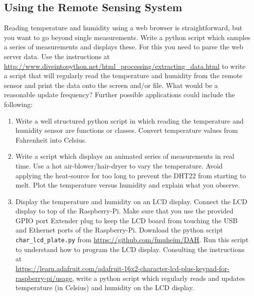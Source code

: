 \subsection{Using the  Remote Sensing System}

Reading temperature and humidity using a web browser is 
straightforward, but you want to go beyond single measurements.
Write a python script which samples a series of measurements
and displays these. For this you need to parse the web server data.
Use the instructions at
\url{http://www.diveintopython.net/html_processing/extracting_data.html} 
to write a script that will regularly read the temperature and humidity from
the remote sensor and print the data onto the screen and/or file. What would be a reasonable
update frequency? Further possible applications could include the following:

\begin{enumerate}

\item Write a  well structured python script in which reading the temperature and humidity sensor are
functions or classes.  Convert temperature values from Fahrenheit into Celsius.

\item Write a script which displays an animated series of measurements in real time.
Use a hot air-blower/hair-dryer to vary the temperature. 
Avoid applying the heat-source for too long to prevent the DHT22 from starting to melt.
Plot the temperature versus humidity 
and explain what you observe.
 
\item Display the temperature and humidity on an  LCD display. 
Connect the LCD display to top of the Raspberry-Pi. 
Make sure that you use the provided GPIO port Extender plug to keep the LCD board from touching the  USB and Ethernet ports of the Raspberry-Pi. 
Download the python script {\tt  char\_lcd\_plate.py} from  \url{https://github.com/fmuheim/DAH}. Run this script to understand how to program the LCD display. Consulting the instructions at \\
\url{https://learn.adafruit.com/adafruit-16x2-character-lcd-plus-keypad-for-raspberry-pi/usage}, 
write a python script which regularly reads  and updates temperature (in Celsius) and humidity 
on the LCD display.

\end{enumerate}



